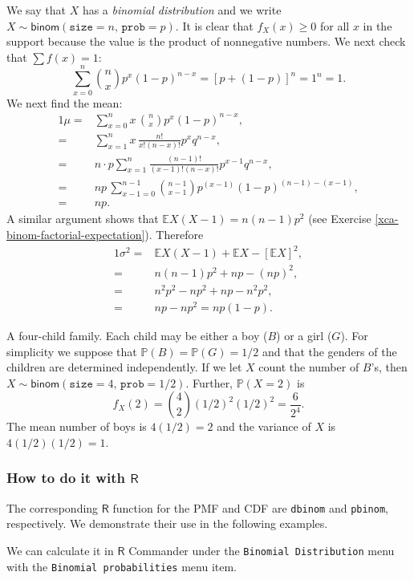 We say that \(X\) has a \emph{binomial distribution} and we write
\(X\sim\mathsf{binom}(\mathtt{size}=n,\,\mathtt{prob}=p)\). It is
clear that \(f_{X}(x)\geq0\) for all \(x\) in the support because the
value is the product of nonnegative numbers. We next check that \(\sum
f(x)=1\): \[ \sum_{x = 0}^{n}{n \choose x} p^{x} (1 - p)^{n - x} =
[p + (1 - p)]^{n} = 1^{n} = 1.  \] We next find the mean:
\begin{alignat*}{1}
\mu= & \sum_{x=0}^{n}x\,{n \choose x}p^{x}(1-p)^{n-x},\\
= & \sum_{x=1}^{n}x\,\frac{n!}{x!(n-x)!}p^{x}q^{n-x},\\
= & n\cdot p\sum_{x=1}^{n}\frac{(n-1)!}{(x-1)!(n-x)!}p^{x-1}q^{n-x},\\
= & np\,\sum_{x-1=0}^{n-1}{n-1 \choose x-1}p^{(x-1)}(1-p)^{(n-1)-(x-1)},\\
= & np.
\end{alignat*}
A similar argument shows that \(\mathbb{E} X(X - 1) = n(n - 1)p^{2}\) (see
Exercise \ref{xca-binom-factorial-expectation}). Therefore
\begin{alignat*}{1}
\sigma^{2}= & \mathbb{E} X(X-1)+\mathbb{E} X-[\mathbb{E} X]^{2},\\
= & n(n-1)p^{2}+np-(np)^{2},\\
= & n^{2}p^{2}-np^{2}+np-n^{2}p^{2},\\
= & np-np^{2}=np(1-p).
\end{alignat*}


A four-child family. Each child may be either a boy (\(B\)) or a girl
(\(G\)). For simplicity we suppose that
\(\mathbb{P}(B)=\mathbb{P}(G)=1/2\) and that the genders of the
children are determined independently. If we let \(X\) count the
number of \(B\)'s, then
\(X\sim\mathsf{binom}(\mathtt{size}=4,\,\mathtt{prob}=1/2)\). Further,
\(\mathbb{P}(X=2)\) is
\[
f_{X}(2)={4 \choose 2}(1/2)^{2}(1/2)^{2}=\frac{6}{2^{4}}.
\]
The mean number of boys is \(4(1/2)=2\) and the variance of \(X\) is
\(4(1/2)(1/2)=1\).

\subsubsection{How to do it with \(\mathsf{R}\)}
\label{sec-5-3-1-1}

The corresponding \(\mathsf{R}\) function for the PMF and CDF are
\texttt{dbinom} and \texttt{pbinom}, respectively. We demonstrate their use in the
following examples.


We can calculate it in \(\mathsf{R}\) Commander under the \texttt{Binomial
Distribution} menu with the \texttt{Binomial probabilities} menu item.

